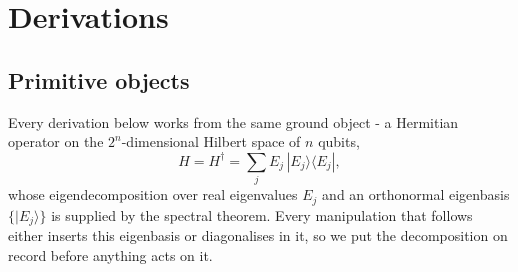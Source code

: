 \section{Derivations}\label{app:NA1}

\subsection*{Primitive objects}

Every derivation below works from the same ground object - a Hermitian operator on the $2^n$-dimensional Hilbert space of $n$ qubits,
\begin{equation*}
H = H^\dagger = \sum_j E_j \, |E_j\rangle\langle E_j| ,
\end{equation*}
whose eigendecomposition over real eigenvalues $E_j$ and an orthonormal eigenbasis $\{|E_j\rangle\}$ is supplied by the spectral theorem. Every manipulation that follows either inserts this eigenbasis or diagonalises in it, so we put the decomposition on record before anything acts on it.

